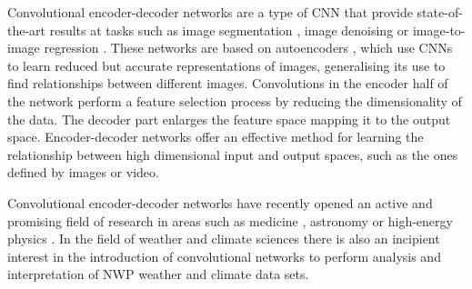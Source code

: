\medskip

Convolutional encoder-decoder networks are a type of CNN that provide state-of-the-art results at tasks such as image segmentation \citep{badrinarayanan2017segnet}, image denoising \citep{mao2016image} or image-to-image regression \citep{isola2017image}. These networks are based on autoencoders \citep{hinton2006reducing}, which use CNNs to learn reduced but accurate representations of images, generalising its use to find relationships between different images. Convolutions in the encoder half of the network perform a feature selection process by reducing the dimensionality of the data. The decoder part enlarges the feature space mapping it to the output space. Encoder-decoder networks offer an effective method for learning the relationship between high dimensional input and output spaces, such as the ones defined by images or video.

\medskip

Convolutional encoder-decoder networks have recently opened an active and promising field of research in areas such as medicine \citep{greenspan2016guest}, astronomy \citep{shallue2018identifying} or high-energy physics \citep{baldi2014searching}. In the field of weather and climate sciences there is also an incipient interest in the introduction of convolutional networks to perform analysis and interpretation of NWP weather and climate data sets.

\bigskip
\bigskip


\bigskip
\bigskip


\medskip











